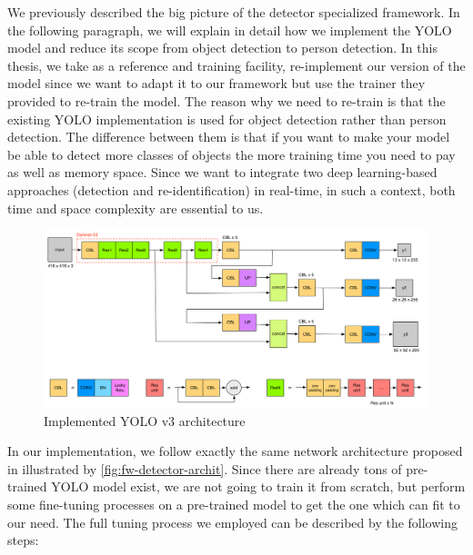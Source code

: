We previously described the big picture of the detector specialized framework.
In the following paragraph, we will explain in detail how we implement the YOLO
model and reduce its scope from object detection to person detection.
In this thesis, we take \cite{yolov3-keras-github} as a reference and training
facility, re-implement our version of the model since we want to adapt it to
our framework but use the trainer they provided to re-train the model.
The reason why we need to re-train is that the existing YOLO implementation
is used for object detection rather than person detection.
The difference between them is that if you want to make your model be able to
detect more classes of objects the more training time you need to
pay as well as memory space. Since we want to integrate two deep learning-based
approaches (detection and re-identification) in real-time, in such a context,
both time and space complexity are essential to us.

\begin{figure}
    \includegraphics[width=\linewidth]{figures/framework_detector_archit.png}
    \caption{Implemented YOLO v3 architecture}
    \label{fig:fw-detector-archit}
\end{figure}

In our implementation, we follow exactly the same network architecture proposed
in \cite{yolov3-paper-2018} illustrated by \autoref{fig:fw-detector-archit}.
Since there are already tons of pre-trained YOLO model exist, we are not going 
to train it from scratch, but perform some fine-tuning processes 
on a pre-trained model to get the one which can fit to our need.
The full tuning process we employed can be described by the following steps:


